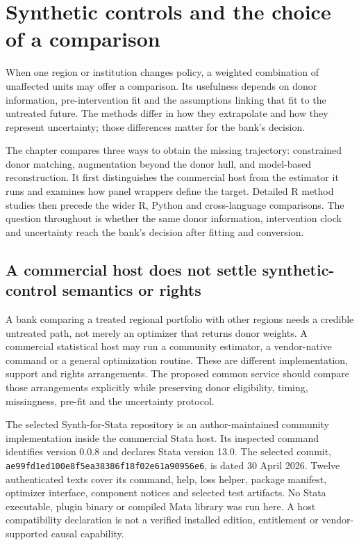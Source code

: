 \chapter{Synthetic controls and the choice of a comparison}
When one region or institution changes policy, a weighted combination
of unaffected units may offer a comparison. Its usefulness depends on donor
information, pre-intervention fit and the assumptions linking that fit to the
untreated future. The methods differ in how they extrapolate and how they
represent uncertainty; those differences matter for the bank's decision.



The chapter compares three ways to obtain the missing trajectory: constrained
donor matching, augmentation beyond the donor hull, and model-based
reconstruction. It first distinguishes the commercial host from the estimator
it runs and examines how panel wrappers define the target. Detailed R method
studies then precede the wider R, Python and cross-language comparisons.
The question throughout is whether the same donor information, intervention
clock and uncertainty reach the bank's decision after fitting and conversion.

\section{A commercial host does not settle synthetic-control semantics or rights}
\label{exec19:synth-scope}

A bank comparing a treated regional portfolio with other regions needs a
credible untreated path, not merely an optimizer that returns donor weights.
A commercial statistical host may run a community estimator, a vendor-native
command or a general optimization routine. These are different implementation,
support and rights arrangements. The proposed common service should compare
those arrangements explicitly while preserving donor eligibility, timing,
missingness, pre-fit and the uncertainty protocol.

The selected Synth-for-Stata repository is an author-maintained community
implementation inside the commercial Stata host. Its inspected command identifies
version 0.0.8 and declares Stata version 13.0. The selected commit,
\texttt{ae99fd1ed100e8f5ea38386f18f02e61a90956e6}, is dated 30 April 2026.
Twelve authenticated texts cover its command, help, loss helper, package
manifest, optimizer interface, component notices and selected test artifacts.
No Stata executable, plugin binary or compiled Mata library was run here.
A host compatibility declaration is not a verified installed edition,
entitlement or vendor-supported causal capability.~\citep{exec19_synth_stata_source}


